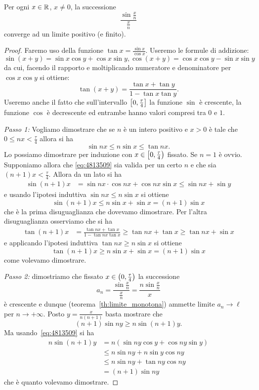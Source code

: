 \begin{theorem}
Per ogni $x\in {\mathbb R}$, $x\neq 0$, la successione
\[
    \frac{\sin \frac xn} {\frac xn}
\]
converge ad un limite positivo (e finito).
\end{theorem}
%
\begin{proof}
Faremo uso della funzione $\tan x= \frac{\sin x}{\cos x}$.
Useremo le formule di addizione:
\[
 \sin(x+y) = \sin x\cos y + \cos x \sin y,
 \cos(x+y) = \cos x \cos y - \sin x \sin y  
\]
da cui, facendo il rapporto e moltiplicando numeratore 
e denominatore per $\cos x \cos y$ si ottiene:
\[
  \tan(x+y) = \frac{\tan x + \tan y}{1-\tan x \tan y}.
\]
Useremo anche il fatto che sull'intervallo 
$\left[0,\frac \tau 4\right]$
la funzione $\sin$ è crescente, la funzione $\cos $
è decrescente ed entrambe hanno valori compresi 
tra $0$ e $1$.

\emph{Passo 1:}
Vogliamo dimostrare che se $n$ è un intero positivo 
e $x>0$ è tale che $0\le nx <\frac \tau 4$ allora si ha
\begin{equation}\label{eq:4813509}
  \sin n x \le n\sin x\le \tan nx.
\end{equation}
Lo possiamo dimostrare per induzione con $x\in\left[0,\frac \tau 4\right)$
fissato.
Se $n=1$ è ovvio.
Supponiamo allora che \eqref{eq:4813509} 
sia valida per un certo $n$ e che  
sia $(n+1)x<\frac \tau 4$. 
Allora da un lato si ha
\begin{align*}
  \sin (n+1)x 
  &= \sin nx \cdot \cos nx + \cos nx\sin x
  \le \sin nx + \sin y
\end{align*}
e usando l'ipotesi induttiva $\sin nx\le n\sin x$ 
si ottiene 
\[
 \sin(n+1)x \le n\sin x+\sin x = (n+1)\sin x  
\]
che è la prima disuguaglianza che dovevamo dimostrare.
Per l'altra disuguaglianza osserviamo che si ha 
\begin{align*}
  \tan(n+1)x 
  &= \frac{\tan nx + \tan x}{1-\tan nx \tan x}
  \ge \tan nx + \tan x
  \ge \tan nx + \sin x
\end{align*}
e applicando l'ipotesi induttiva 
$\tan nx\ge n\sin x$ si ottiene 
\[
 \tan(n+1)x 
 \ge n\sin x +\sin x 
 =   (n+1)\sin x
\]
come volevamo dimostrare.

\emph{Passo 2:}
dimostriamo che fissato $x\in \left(0,\frac \tau 4\right)$ 
la successione 
\[
  a_n = \frac{\sin \frac x n}{\frac x n} = \frac{n\sin \frac x n}{x}
\]
è crescente e dunque
(teorema~\ref{th:limite_monotona})
ammette limite $a_n \to \ell$ per $n\to +\infty$.
Posto $y=\frac{x}{n(n+1)}$ basta mostrare che 
\[
  (n+1) \sin ny \ge n \sin (n+1)y.  
\]
Ma usando~\eqref{eq:4813509} si ha 
\begin{align*}
  n \sin(n+1)y
  &=n(\sin ny\cos y + \cos ny \sin y) \\
  &\le n\sin ny + n\sin y\cos ny\\
  &\le n\sin ny + \tan ny\cos ny\\
  &= (n+1)\sin ny
\end{align*}
che è quanto volevamo dimostrare.


\end{proof}
